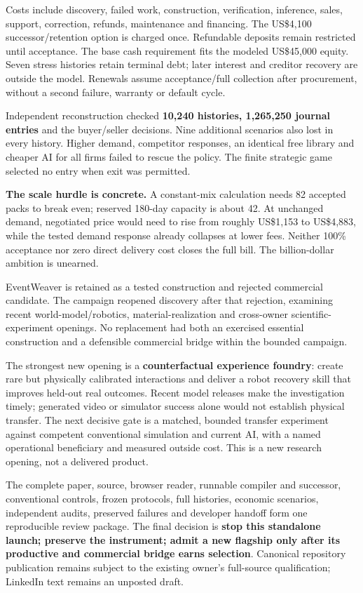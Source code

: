 \documentclass[10pt,letterpaper]{article}
\newcommand{\briefhead}[1]{\vspace{7pt}{\large\bfseries\color{Teal}#1}\par}
\begin{document}
Costs include discovery, failed work, construction, verification, inference, sales, support, correction, refunds, maintenance and financing. The US\$4,100 successor/retention option is charged once. Refundable deposits remain restricted until acceptance. The base cash requirement fits the modeled US\$45,000 equity. Seven stress histories retain terminal debt; later interest and creditor recovery are outside the model. Renewals assume acceptance/full collection after procurement, without a second failure, warranty or default cycle.

Independent reconstruction checked \textbf{10,240 histories, 1,265,250 journal entries} and the buyer/seller decisions. Nine additional scenarios also lost in every history. Higher demand, competitor responses, an identical free library and cheaper AI for all firms failed to rescue the policy. The finite strategic game selected no entry when exit was permitted.

\textbf{The scale hurdle is concrete.} A constant-mix calculation needs 82 accepted packs to break even; reserved 180-day capacity is about 42. At unchanged demand, negotiated price would need to rise from roughly US\$1,153 to US\$4,883, while the tested demand response already collapses at lower fees. Neither 100\% acceptance nor zero direct delivery cost closes the full bill. The billion-dollar ambition is unearned.

\briefhead{A decision that reopens the search}
EventWeaver is retained as a tested construction and rejected commercial candidate. The campaign reopened discovery after that rejection, examining recent world-model/robotics, material-realization and cross-owner scientific-experiment openings. No replacement had both an exercised essential construction and a defensible commercial bridge within the bounded campaign.

The strongest new opening is a \textbf{counterfactual experience foundry}: create rare but physically calibrated interactions and deliver a robot recovery skill that improves held-out real outcomes. Recent model releases make the investigation timely; generated video or simulator success alone would not establish physical transfer. The next decisive gate is a matched, bounded transfer experiment against competent conventional simulation and current AI, with a named operational beneficiary and measured outside cost. This is a new research opening, not a delivered product.

\briefhead{What the edition leaves behind}
The complete paper, source, browser reader, runnable compiler and successor, conventional controls, frozen protocols, full histories, economic scenarios, independent audits, preserved failures and developer handoff form one reproducible review package. The final decision is \textbf{stop this standalone launch; preserve the instrument; admit a new flagship only after its productive and commercial bridge earns selection}. Canonical repository publication remains subject to the existing owner's full-source qualification; LinkedIn text remains an unposted draft.
\end{document}
